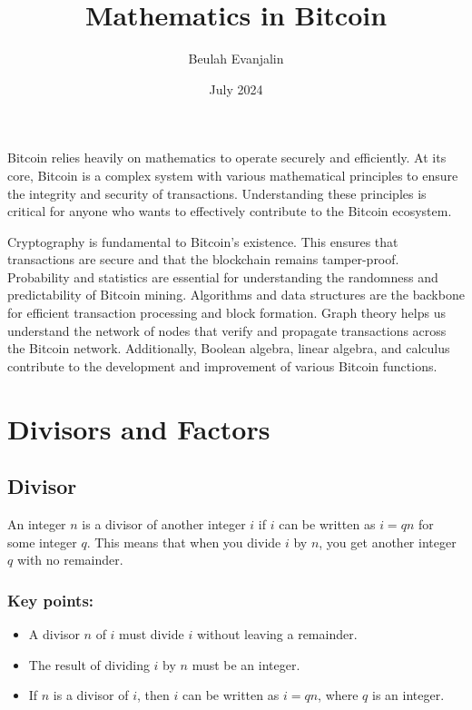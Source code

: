 \documentclass[11pt, letterpaper]{article}
\title{Mathematics in Bitcoin}
\author{Beulah Evanjalin}
\date{July 2024}
\begin{document}
\maketitle

Bitcoin relies heavily on mathematics to operate securely and efficiently. At its core, Bitcoin is a complex system with various mathematical principles to ensure the integrity and security of transactions. Understanding these principles is critical for anyone who wants to effectively contribute to the Bitcoin ecosystem.

Cryptography is fundamental to Bitcoin’s existence. This ensures that transactions are secure and that the blockchain remains tamper-proof. Probability and statistics are essential for understanding the randomness and predictability of Bitcoin mining. Algorithms and data structures are the backbone for efficient transaction processing and block formation. Graph theory helps us understand the network of nodes that verify and propagate transactions across the Bitcoin network. Additionally, Boolean algebra, linear algebra, and calculus contribute to the development and improvement of various Bitcoin functions.

\section{Divisors and Factors}

\subsection{Divisor}
An integer \( n \) is a divisor of another integer \( i \) if \( i \) can be written as \( i = qn \) for some integer \( q \). This means that when you divide \( i \) by \( n \), you get another integer \( q \) with no remainder.
\subsubsection*{Key points:}
\begin{itemize}
  \item A divisor \( n \) of \( i \) must divide \( i \) without leaving a remainder.
  \item The result of dividing \( i \) by \( n \) must be an integer.
  \item If \( n \) is a divisor of \( i \), then \( i \) can be written as \( i = qn \), where \( q \) is an integer.
\end{itemize}
\end{document}
